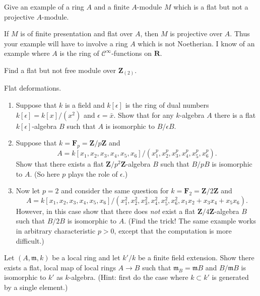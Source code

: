 \begin{exercise}
\label{exercise-flat-not-projective}
Give an example of a ring $A$ and a finite $A$-module $M$
which is a flat but not a projective $A$-module.
\end{exercise}

\begin{remark}
\label{remark-flat-not-projective}
If $M$ is of finite presentation and flat over $A$,
then $M$ is projective over $A$. Thus your example will have to
involve a ring $A$ which is not Noetherian. I know of an example
where $A$ is the ring of ${\mathcal C}^\infty$-functions on ${\mathbf R}$.
\end{remark}

\begin{exercise}
\label{exercise-flat-not-free-dvr}
Find a flat but not free module over ${\mathbf Z}_{(2)}$.
\end{exercise}

\begin{exercise}
\label{exercise-flat-deformations}
Flat deformations.
\begin{enumerate}
\item Suppose that $k$ is a field and $k[\epsilon]$ is the ring of
dual numbers $k[\epsilon] = k[x]/(x^2)$ and $\epsilon = \bar x$. Show that for
any $k$-algebra $A$ there is a flat $k[\epsilon]$-algebra $B$ such that
$A$ is isomorphic to $B/\epsilon B$.
\item Suppose that $k = {\mathbf F}_p = {\mathbf Z}/p{\mathbf Z}$ and
$$
A = k[x_1, x_2, x_3, x_4, x_5, x_6]/
(x_1^p, x_2^p, x_3^p, x_4^p, x_5^p, x_6^p).
$$
Show that there exists a flat ${\mathbf Z}/p^2{\mathbf Z}$-algebra $B$ such
that $B/pB$ is isomorphic to $A$. (So here $p$ plays the role of $\epsilon$.)
\item Now let $p = 2$ and consider the same question for
$k = {\mathbf F}_2 = {\mathbf Z}/2{\mathbf Z}$ and
$$
A = k[x_1, x_2, x_3, x_4, x_5, x_6]/
(x_1^2, x_2^2, x_3^2, x_4^2, x_5^2, x_6^2, x_1x_2 + x_3x_4 + x_5x_6).
$$
However, in this case show that there does {\it not} exist a flat
${\mathbf Z}/4{\mathbf Z}$-algebra $B$ such that $B/2B$ is isomorphic to
$A$. (Find the trick! The same example works in arbitrary characteristic
$p > 0$, except that the computation is more difficult.)
\end{enumerate}
\end{exercise}

\begin{exercise}
\label{exercise-flat-given-residue-field-extension}
Let $(A, {\mathfrak m}, k)$ be a local ring and let $k'/k$ be
a finite field extension. Show there exists a flat, local map of
local rings $A \to B$ such that ${\mathfrak m}_B = {\mathfrak m} B$ and
$B/{\mathfrak m} B$ is
isomorphic to $k'$ as $k$-algebra. (Hint: first do the case where
$k \subset k'$ is generated by a single element.)
\end{exercise}

